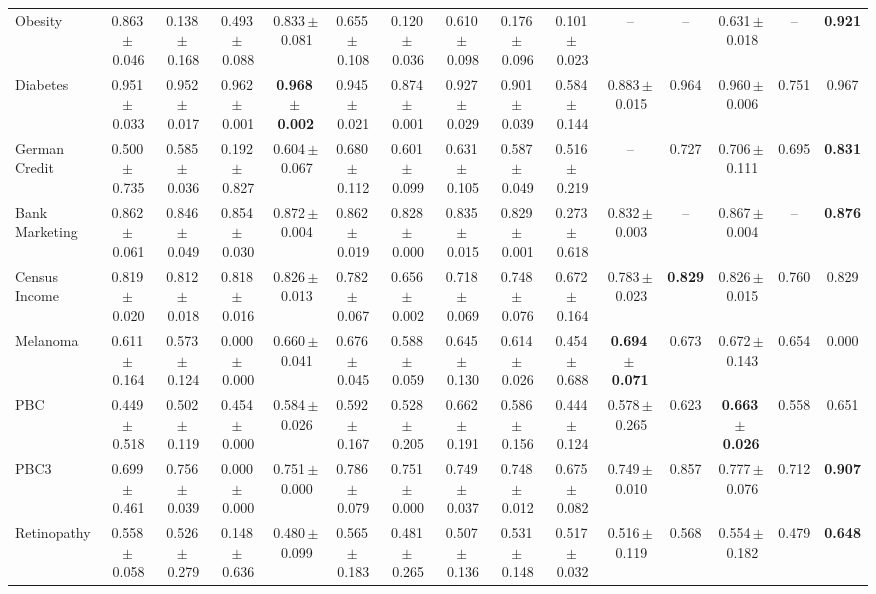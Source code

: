 \documentclass[8pt]{extarticle}
\begin{document}
\begin{longtable}{l*{14}{c}}
Obesity & 0.863\,$\pm$\,0.046 & 0.138\,$\pm$\,0.168 & 0.493\,$\pm$\,0.088 & 0.833\,$\pm$\,0.081 & 0.655\,$\pm$\,0.108 & 0.120\,$\pm$\,0.036 & 0.610\,$\pm$\,0.098 & 0.176\,$\pm$\,0.096 & 0.101\,$\pm$\,0.023 & -- & -- & 0.631\,$\pm$\,0.018 & -- & \textbf{0.921} \\
Diabetes & 0.951\,$\pm$\,0.033 & 0.952\,$\pm$\,0.017 & 0.962\,$\pm$\,0.001 & \textbf{0.968\,$\pm$\,0.002} & 0.945\,$\pm$\,0.021 & 0.874\,$\pm$\,0.001 & 0.927\,$\pm$\,0.029 & 0.901\,$\pm$\,0.039 & 0.584\,$\pm$\,0.144 & 0.883\,$\pm$\,0.015 & 0.964 & 0.960\,$\pm$\,0.006 & 0.751 & 0.967 \\
German Credit & 0.500\,$\pm$\,0.735 & 0.585\,$\pm$\,0.036 & 0.192\,$\pm$\,0.827 & 0.604\,$\pm$\,0.067 & 0.680\,$\pm$\,0.112 & 0.601\,$\pm$\,0.099 & 0.631\,$\pm$\,0.105 & 0.587\,$\pm$\,0.049 & 0.516\,$\pm$\,0.219 & -- & 0.727 & 0.706\,$\pm$\,0.111 & 0.695 & \textbf{0.831} \\
Bank Marketing & 0.862\,$\pm$\,0.061 & 0.846\,$\pm$\,0.049 & 0.854\,$\pm$\,0.030 & 0.872\,$\pm$\,0.004 & 0.862\,$\pm$\,0.019 & 0.828\,$\pm$\,0.000 & 0.835\,$\pm$\,0.015 & 0.829\,$\pm$\,0.001 & 0.273\,$\pm$\,0.618 & 0.832\,$\pm$\,0.003 & -- & 0.867\,$\pm$\,0.004 & -- & \textbf{0.876} \\
Census Income & 0.819\,$\pm$\,0.020 & 0.812\,$\pm$\,0.018 & 0.818\,$\pm$\,0.016 & 0.826\,$\pm$\,0.013 & 0.782\,$\pm$\,0.067 & 0.656\,$\pm$\,0.002 & 0.718\,$\pm$\,0.069 & 0.748\,$\pm$\,0.076 & 0.672\,$\pm$\,0.164 & 0.783\,$\pm$\,0.023 & \textbf{0.829} & 0.826\,$\pm$\,0.015 & 0.760 & 0.829 \\
Melanoma & 0.611\,$\pm$\,0.164 & 0.573\,$\pm$\,0.124 & 0.000\,$\pm$\,0.000 & 0.660\,$\pm$\,0.041 & 0.676\,$\pm$\,0.045 & 0.588\,$\pm$\,0.059 & 0.645\,$\pm$\,0.130 & 0.614\,$\pm$\,0.026 & 0.454\,$\pm$\,0.688 & \textbf{0.694\,$\pm$\,0.071} & 0.673 & 0.672\,$\pm$\,0.143 & 0.654 & 0.000 \\
PBC & 0.449\,$\pm$\,0.518 & 0.502\,$\pm$\,0.119 & 0.454\,$\pm$\,0.000 & 0.584\,$\pm$\,0.026 & 0.592\,$\pm$\,0.167 & 0.528\,$\pm$\,0.205 & 0.662\,$\pm$\,0.191 & 0.586\,$\pm$\,0.156 & 0.444\,$\pm$\,0.124 & 0.578\,$\pm$\,0.265 & 0.623 & \textbf{0.663\,$\pm$\,0.026} & 0.558 & 0.651 \\
PBC3 & 0.699\,$\pm$\,0.461 & 0.756\,$\pm$\,0.039 & 0.000\,$\pm$\,0.000 & 0.751\,$\pm$\,0.000 & 0.786\,$\pm$\,0.079 & 0.751\,$\pm$\,0.000 & 0.749\,$\pm$\,0.037 & 0.748\,$\pm$\,0.012 & 0.675\,$\pm$\,0.082 & 0.749\,$\pm$\,0.010 & 0.857 & 0.777\,$\pm$\,0.076 & 0.712 & \textbf{0.907} \\
Retinopathy & 0.558\,$\pm$\,0.058 & 0.526\,$\pm$\,0.279 & 0.148\,$\pm$\,0.636 & 0.480\,$\pm$\,0.099 & 0.565\,$\pm$\,0.183 & 0.481\,$\pm$\,0.265 & 0.507\,$\pm$\,0.136 & 0.531\,$\pm$\,0.148 & 0.517\,$\pm$\,0.032 & 0.516\,$\pm$\,0.119 & 0.568 & 0.554\,$\pm$\,0.182 & 0.479 & \textbf{0.648} \\

\end{longtable}
\end{document}

